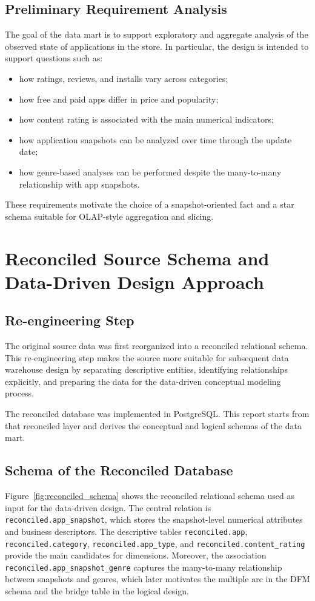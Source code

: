 \documentclass[11pt,a4paper]{article}
\newcommand{\dbms}{PostgreSQL}
\begin{document}
\subsection{Preliminary Requirement Analysis}
The goal of the data mart is to support exploratory and aggregate analysis of the observed state of applications in the store. In particular, the design is intended to support questions such as:
\begin{itemize}[leftmargin=1.5em]
    \item how ratings, reviews, and installs vary across categories;
    \item how free and paid apps differ in price and popularity;
    \item how content rating is associated with the main numerical indicators;
    \item how application snapshots can be analyzed over time through the update date;
    \item how genre-based analyses can be performed despite the many-to-many relationship with app snapshots.
\end{itemize}

These requirements motivate the choice of a snapshot-oriented fact and a star schema suitable for OLAP-style aggregation and slicing.

\section{Reconciled Source Schema and Data-Driven Design Approach}

\subsection{Re-engineering Step}
The original source data was first reorganized into a reconciled relational schema. This re-engineering step makes the source more suitable for subsequent data warehouse design by separating descriptive entities, identifying relationships explicitly, and preparing the data for the data-driven conceptual modeling process.

The reconciled database was implemented in \dbms. This report starts from that reconciled layer and derives the conceptual and logical schemas of the data mart.

\subsection{Schema of the Reconciled Database}
Figure~\ref{fig:reconciled_schema} shows the reconciled relational schema used as input for the data-driven design. The central relation is \texttt{reconciled.app\_snapshot}, which stores the snapshot-level numerical attributes and business descriptors. The descriptive tables \texttt{reconciled.app}, \texttt{reconciled.category}, \texttt{reconciled.app\_type}, and \texttt{reconciled.content\_rating} provide the main candidates for dimensions. Moreover, the association \texttt{reconciled.app\_snapshot\_genre} captures the many-to-many relationship between snapshots and genres, which later motivates the multiple arc in the DFM schema and the bridge table in the logical design.
\end{document}
